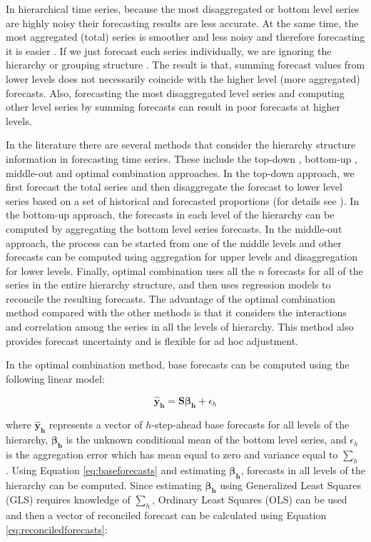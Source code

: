 \documentclass[11pt,a4paper,]{article}
\begin{document}
In hierarchical time series, because the most disaggregated or bottom
level series are highly noisy their forecasting results are less
accurate. At the same time, the most aggregated (total) series is
smoother and less noisy and therefore forecasting it is easier
\autocite{fliedner2001hierarchical}. If we just forecast each series
individually, we are ignoring the hierarchy or grouping structure
\autocite{hyndman2016fast}. The result is that, summing forecast values
from lower levels does not necessarily coincide with the higher level
(more aggregated) forecasts. Also, forecasting the most disaggregated
level series and computing other level series by summing forecasts can
result in poor forecasts at higher levels.

In the literature there are several methods that consider the hierarchy
structure information in forecasting time series. These include the
top-down \autocite{gross1990disaggregation}, bottom-up
\autocite{kahn1998revisiting}, middle-out and optimal combination
\autocite{hyndman2011optimal} approaches. In the top-down approach, we
first forecast the total series and then disaggregate the forecast to
lower level series based on a set of historical and forecasted
proportions (for details see \textcite{athanasopoulos2009hierarchical}).
In the bottom-up approach, the forecasts in each level of the hierarchy
can be computed by aggregating the bottom level series forecasts. In the
middle-out approach, the process can be started from one of the middle
levels and other forecasts can be computed using aggregation for upper
levels and disaggregation for lower levels. Finally, optimal combination
uses all the \(n\) forecasts for all of the series in the entire
hierarchy structure, and then uses regression models to reconcile the
resulting forecasts. The advantage of the optimal combination method
compared with the other methods is that it considers the interactions
and correlation among the series in all the levels of hierarchy. This
method also provides forecast uncertainty and is flexible for ad hoc
adjustment.

In the optimal combination method, base forecasts can be computed using
the following linear model:

\begin{equation}\label{eq:baseforecasts}
   \mathbf{\hat{y}_h} = \mathbf{S}\boldsymbol{\beta_h}+\epsilon_h
\end{equation}

where \(\mathbf{\hat{y}_h}\) represents a vector of \(h\)-step-ahead
base forecasts for all levels of the hierarchy, \(\boldsymbol{\beta_h}\)
is the unknown conditional mean of the bottom level series, and
\(\epsilon_h\) is the aggregation error which has mean equal to zero and
variance equal to \(\sum_h\) \autocite{hyndman2016fast}. Using Equation
\eqref{eq:baseforecasts} and estimating \(\boldsymbol{\beta_h}\),
forecasts in all levels of the hierarchy can be computed. Since
estimating \(\boldsymbol{\beta_h}\) using Generalized Least Squares
(GLS) requires knowledge of \(\sum_h\), Ordinary Least Squares (OLS) can
be used and then a vector of reconciled forecast can be calculated using
Equation \eqref{eq:reconciledforecasts}:
\end{document}
